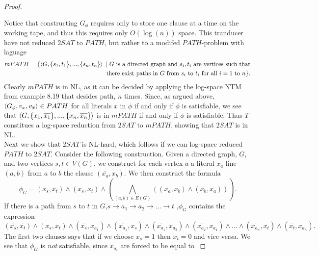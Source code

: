\documentclass[a4paper,11pt]{article}
\newcommand{\pipe}{\ \vert \ }
\numberwithin{equation}{section}
\begin{document}
\begin{proof}
\begin{enumerate}
			\end{enumerate}
			Notice that constructing $ G_\phi $ requires only to store one clause at a time on the working tape, and thus this requires only $ O(\log(n)) $ space. This tranducer have not reduced $ 2SAT $ to $ PATH $, but rather to a modifed $ PATH $-problem with laguage \begin{equation*}
			\begin{aligned}
			mPATH=\{\braket{G,\{s_1,t_1\},...,\{s_n,t_n\}}\pipe G\text{ is a directed graph and } s_i,t_i\text{ are vertices such that}\\ \text{there exist paths in }G\text{ from }s_i \text{ to }t_i\text{ for all }i=1\text{ to }n\}.
			\end{aligned}
			\end{equation*}
			Clearly $ mPATH $ is in NL, as it can be decided by applying the log-space NTM from example 8.19 that desides path, $ n $ times.
			Since, as argued above, $ \braket{G_\phi,v_x,v_{\overline{x}}}\in PATH $ for all literals $ x $ in $ \phi $ if and only if $ \phi $ is satisfiable, we see that $ \braket{G,\{x_1,\overline{x_1}\},...,\{x_n,\overline{x_n}\}} $ is in $ mPATH $ if and only if $ \phi $ is satisfiable. Thus $ T $ constitues a log-space reduction from $ 2SAT $ to $ mPATH $, showing that $2SAT $ is in NL.\\
		Next we show that $ 2SAT $ is NL-hard, which follows if we can log-space reduced $ PATH $ to $ 2SAT $. Consider the following construction. Given a directed graph, $ G $, and two vertices $ s,t\in V(G) $, we construct for each vertex $ a $ a literal $ x_a $ line $ (a,b) $ from $ a $ to $ b $ the clause $ (\overline{x_a},x_b) $. We then construct the formula\begin{equation*}
		\phi_G=(\overline{x_s},\overline{x_t})\wedge(x_s,x_t)\wedge\left(\bigwedge_{(a,b)\in E(G)}\left((\overline{x_a},x_b)\wedge(\overline{x_b},x_a)\right)\right).
		\end{equation*}
		If there is a path from $ s $ to $ t $ in $ G $,$ s\to a_1\to a_2\to...\to t  $ ,$ \phi_G $ contains the expression \begin{equation*}
		(\overline{x_s},\overline{x_t})\wedge(x_s,x_t)\wedge(\overline{x_s},x_{a_1})\wedge(\overline{x_{a_1}},x_{s})\wedge(\overline{x_{a_1}},x_{a_2})\wedge(\overline{x_{a_2}},x_{a_1})\wedge...\wedge(\overline{x_{a_n}},x_t)\wedge(\overline{x_t},x_{a_n}).
		\end{equation*} 
		The first two clauses says that if we choose $ x_s=1 $ then $ x_t=0 $ and vice versa. We see that $ \phi_G $ is \emph{not} satisfiable, since $ x_{a_i} $ are forced to be equal to $  $
		

\end{proof}
\end{document}
